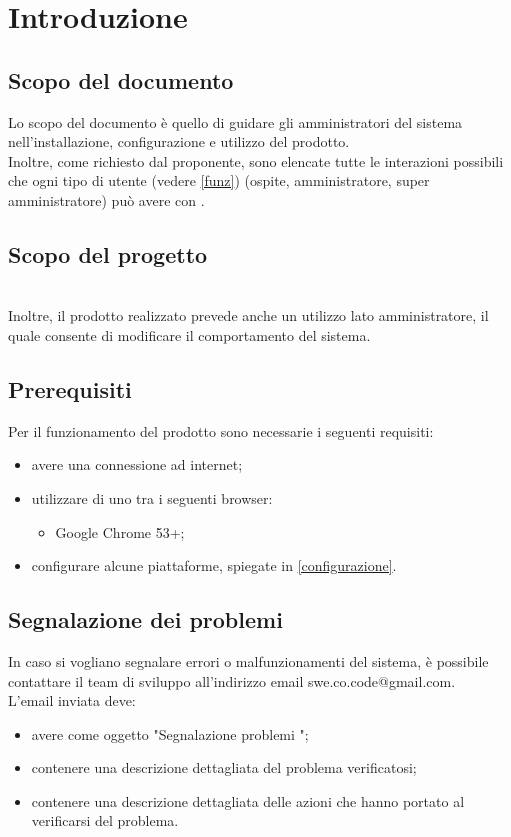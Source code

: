 \section{Introduzione}
\subsection{Scopo del documento}
Lo scopo del documento è quello di guidare gli amministratori del sistema nell'installazione, configurazione e utilizzo del prodotto.\\
Inoltre, come richiesto dal proponente, sono elencate tutte le interazioni possibili che ogni tipo di utente (vedere \ref{funz}) (ospite, amministratore, super amministratore) può avere con \PROGETTO.\\
\subsection{Scopo del progetto}
\SCOPO\\
Inoltre, il prodotto realizzato prevede anche un utilizzo lato amministratore, il quale consente di modificare il comportamento del sistema.
\subsection{Prerequisiti}
Per il funzionamento del prodotto sono necessarie i seguenti requisiti:
\begin{itemize}
	\item avere una connessione ad internet;
	\item utilizzare di uno tra i seguenti browser:
	\begin{itemize}
		\item Google Chrome 53+;
	\end{itemize}
	\item configurare alcune piattaforme, spiegate in \ref{configurazione}.
\end{itemize}
\subsection{Segnalazione dei problemi}
In caso si vogliano segnalare errori o malfunzionamenti del sistema, è possibile contattare il team di sviluppo \GRUPPO{} all'indirizzo email swe.co.code@gmail.com. \\
L'email inviata deve:
\begin{itemize}
	\item avere come oggetto "Segnalazione problemi \PROGETTO";
	\item contenere una descrizione dettagliata del problema verificatosi;
	\item contenere una descrizione dettagliata delle azioni che hanno portato al verificarsi del problema.
\end{itemize}